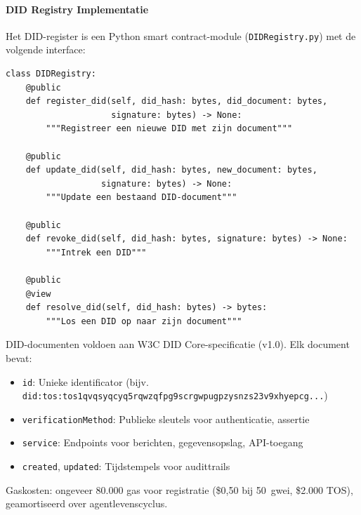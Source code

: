 \documentclass[11pt]{article}
\begin{document}
\paragraph{DID Registry Implementatie} Het DID-register is een Python smart contract-module (\texttt{DIDRegistry.py}) met de volgende interface:
\begin{verbatim}
class DIDRegistry:
    @public
    def register_did(self, did_hash: bytes, did_document: bytes,
                     signature: bytes) -> None:
        """Registreer een nieuwe DID met zijn document"""

    @public
    def update_did(self, did_hash: bytes, new_document: bytes,
                   signature: bytes) -> None:
        """Update een bestaand DID-document"""

    @public
    def revoke_did(self, did_hash: bytes, signature: bytes) -> None:
        """Intrek een DID"""

    @public
    @view
    def resolve_did(self, did_hash: bytes) -> bytes:
        """Los een DID op naar zijn document"""
\end{verbatim}
DID-documenten voldoen aan W3C DID Core-specificatie (v1.0). Elk document bevat:
\begin{itemize}[noitemsep]
  \item \texttt{id}: Unieke identificator (bijv. \texttt{did:tos:tos1qvqsyqcyq5rqwzqfpg9scrgwpugpzysnzs23v9xhyepcg...})
  \item \texttt{verificationMethod}: Publieke sleutels voor authenticatie, assertie
  \item \texttt{service}: Endpoints voor berichten, gegevensopslag, API-toegang
  \item \texttt{created}, \texttt{updated}: Tijdstempels voor audittrails
\end{itemize}
Gaskosten: ongeveer 80.000 gas voor registratie (\$0,50 bij 50~gwei, \$2.000 TOS), geamortiseerd over agentlevenscyclus.
\end{document}
